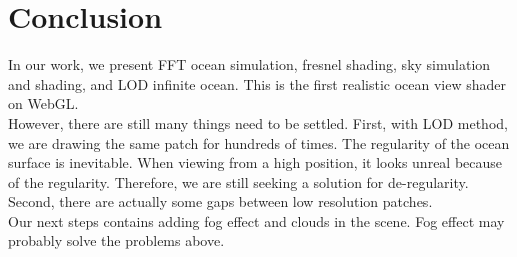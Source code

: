 \documentclass{jcgt}
\begin{document}
\section{Conclusion}
In our work, we present FFT ocean simulation, fresnel shading, sky simulation and shading, and LOD infinite ocean. This is the first realistic ocean view shader on WebGL. \\

However, there are still many things need to be settled. First, with LOD method, we are drawing the same patch for hundreds of times. The regularity of the ocean surface is inevitable. When viewing from a high position, it looks unreal because of the regularity. Therefore, we are still seeking a solution for de-regularity. Second, there are actually some gaps between low resolution patches.\\

Our next steps contains adding fog effect and clouds in the scene. Fog effect may probably solve the problems above.




\small


\end{document}
